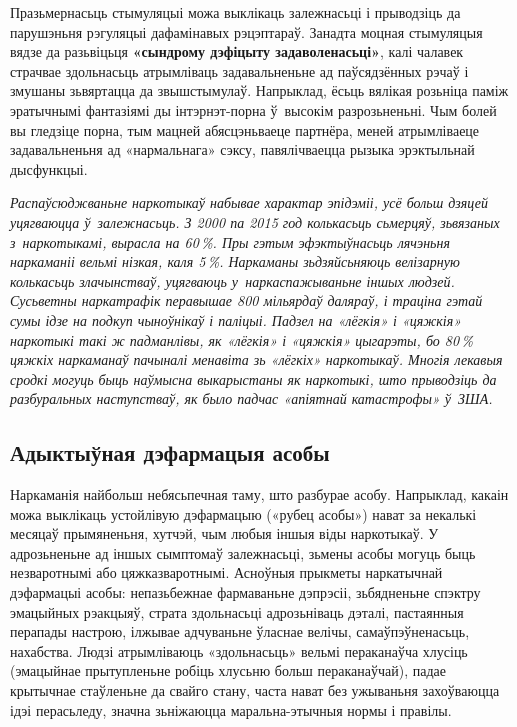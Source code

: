 Празьмернасьць стымуляцыі можа выклікаць залежнасьці і прыводзіць да парушэньня рэгуляцыі дафамінавых рэцэптараў. Занадта моцная стымуляцыя вядзе да разьвіцьця \textbf{«сындрому дэфіцыту задаволенасьці»}, калі чалавек страчвае здольнасьць атрымліваць задавальненьне ад паўсядзённых рэчаў і змушаны зьвяртацца да звышстымулаў. Напрыклад, ёсьць вялікая розьніца паміж эратычнымі фантазіямі ды інтэрнэт-порна ў~высокім разрозьненьні. Чым болей вы гледзіце порна, тым мацней абясцэньваеце партнёра, меней атрымліваеце задавальненьня ад «нармальнага» сэксу, павялічваецца рызыка эрэктыльнай дысфункцыі.

\emph{Распаўсюджваньне наркотыкаў набывае характар эпідэміі, усё больш дзяцей уцягваюцца ў~залежнасьць. З 2000 па 2015 год колькасьць сьмерцяў, зьвязаных з~наркотыкамі, вырасла на 60\,\%. Пры гэтым эфэктыўнасьць лячэньня наркаманіі вельмі нізкая, каля 5\,\%. Наркаманы зьдзяйсьняюць велізарную колькасьць злачынстваў, уцягваюць у~наркаспажываньне іншых людзей. Сусьветны наркатрафік перавышае 800 мільярдаў даляраў, і траціна гэтай сумы ідзе на подкуп чыноўнікаў і паліцыі. Падзел на «лёгкія» і «цяжкія» наркотыкі такі ж падманлівы, як «лёгкія» і «цяжкія» цыгарэты, бо 80\,\% цяжкіх наркаманаў пачыналі менавіта зь «лёгкіх» наркотыкаў. Многія лекавыя сродкі могуць быць наўмысна выкарыстаны як наркотыкі, што прыводзіць да разбуральных наступстваў, як было падчас «апіятнай катастрофы» ў~ЗША.}

\subsection*{Адыктыўная дэфармацыя асобы}

Наркаманія найбольш небясьпечная таму, што разбурае асобу. Напрыклад, какаін можа выклікаць устойлівую дэфармацыю («рубец асобы») нават за некалькі месяцаў прымяненьня, хутчэй, чым любыя іншыя віды наркотыкаў. У адрозьненьне ад іншых сымптомаў залежнасьці, зьмены асобы могуць быць незваротнымі або цяжказваротнымі. Асноўныя прыкметы наркатычнай дэфармацыі асобы: непазьбежнае фармаваньне дэпрэсіі, зьбядненьне спэктру эмацыйных рэакцыяў, страта здольнасьці адрозьніваць дэталі, пастаянныя перапады настрою, ілжывае адчуваньне ўласнае велічы, самаўпэўненасьць, нахабства. Людзі атрымліваюць «здольнасьць» вельмі пераканаўча хлусіць (эмацыйнае прытупленьне робіць хлусьню больш пераканаўчай), падае крытычнае стаўленьне да свайго стану, часта нават без ужываньня захоўваюцца ідэі перасьледу, значна зьніжаюцца маральна-этычныя нормы і правілы.

